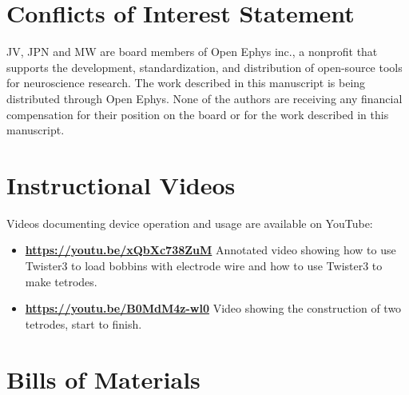 \documentclass[11pt,a4paper]{article}
\begin{document}
\section*{Conflicts of Interest Statement}
JV, JPN and MW are board members of Open Ephys inc., a nonprofit that supports
the development, standardization, and distribution of open-source tools for
neuroscience research. The work described in this manuscript is being
distributed through Open Ephys. None of the authors are receiving any financial
compensation for their position on the board or for the work described in this
manuscript.

\medskip




\newpage

\begin{appendices}

\section{Instructional Videos}\label{s:videos}

Videos documenting device operation and usage are available on YouTube:

\begin{itemize}
    \item \textbf{\url{https://youtu.be/xQbXc738ZuM}} Annotated video showing
        how to use Twister3 to load bobbins with electrode wire and how to use
        Twister3 to make tetrodes.
    \item \textbf{\url{https://youtu.be/B0MdM4z-wl0}} Video showing the
        construction of two tetrodes, start to finish.
\end{itemize}

\section{Bills of Materials}\label{s:boms}





\end{appendices}
\end{document}
